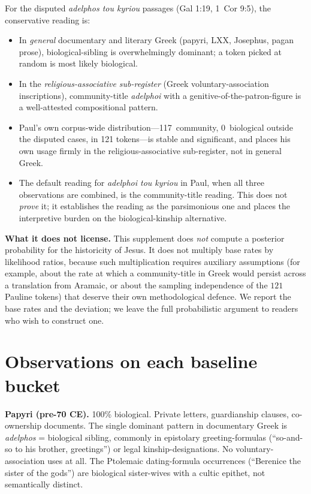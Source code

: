 \documentclass[11pt,oneside]{article}
\begin{document}
For the disputed \textit{adelphos tou kyriou} passages (Gal 1:19,
1~Cor 9:5), the conservative reading is:
\begin{itemize}[leftmargin=1.5em]
\item In \textit{general} documentary and literary Greek (papyri, LXX,
  Josephus, pagan prose), biological-sibling is overwhelmingly
  dominant; a token picked at random is most likely biological.
\item In the \textit{religious-associative sub-register} (Greek
  voluntary-association inscriptions), community-title \textit{adelphoi}
  with a genitive-of-the-patron-figure is a well-attested
  compositional pattern.
\item Paul's own corpus-wide distribution---117~community, 0~biological
  outside the disputed cases, in 121 tokens---is stable and
  significant, and places his own usage firmly in the
  religious-associative sub-register, not in general Greek.
\item The default reading for \textit{adelphoi tou kyriou} in Paul,
  when all three observations are combined, is the community-title
  reading.  This does not \textit{prove} it; it establishes the
  reading as the parsimonious one and places the interpretive burden
  on the biological-kinship alternative.
\end{itemize}

\textbf{What it does not license.}  This supplement does \textit{not}
compute a posterior probability for the historicity of Jesus.  It does
not multiply base rates by likelihood ratios, because such
multiplication requires auxiliary assumptions (for example, about the
rate at which a community-title in Greek would persist across a
translation from Aramaic, or about the sampling independence of the
$121$ Pauline tokens) that deserve their own methodological defence.
We report the base rates and the deviation; we leave the full
probabilistic argument to readers who wish to construct one.

\section*{Observations on each baseline bucket}

\textbf{Papyri (pre-70 CE).}  100\% biological.  Private letters,
guardianship clauses, co-ownership documents.  The single dominant
pattern in documentary Greek is \textit{adelphos} = biological sibling,
commonly in epistolary greeting-formulas (\enquote{so-and-so to his
brother, greetings}) or legal kinship-designations.  No voluntary-
association uses at all.  The Ptolemaic dating-formula occurrences
(\enquote{Berenice the sister of the gods}) are biological
sister-wives with a cultic epithet, not semantically distinct.
\end{document}
